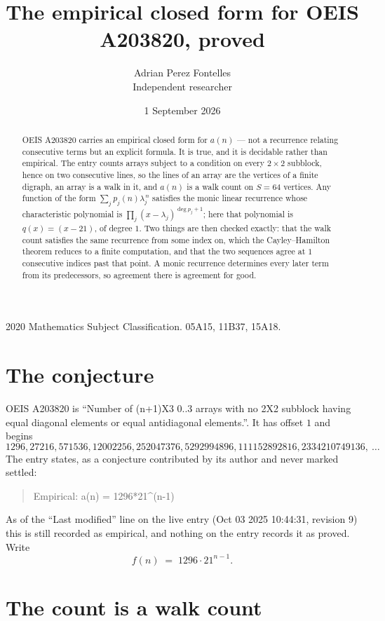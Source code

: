 \documentclass[11pt,a4paper]{article}
\title{The empirical closed form for OEIS A203820, proved}
\author{Adrian Perez Fontelles\\ \small Independent researcher}
\date{1 September 2026}
\theoremstyle{plain}
\theoremstyle{definition}
\begin{document}
\maketitle

\begin{abstract}
OEIS A203820 carries an empirical closed form for $a(n)$ --- not a recurrence relating
consecutive terms but an explicit formula. It is true, and it is decidable rather than
empirical. The entry counts arrays subject to a condition on every $2\times2$ subblock, hence on two consecutive lines, so the lines of an array are the
vertices of a finite digraph, an array is a walk in it, and $a(n)$ is a walk count on
$S=64$ vertices. Any function of the form $\sum_j p_j(n)\lambda_j^{\,n}$ satisfies the
monic linear recurrence whose characteristic polynomial is
$\prod_j(x-\lambda_j)^{\deg p_j+1}$; here that polynomial is $q(x)=(x-21)$, of degree
$1$. Two things are then checked exactly: that the walk count satisfies the same
recurrence from some index on, which the Cayley--Hamilton theorem reduces to a finite
computation, and that the two sequences agree at $1$ consecutive indices past that
point. A monic recurrence determines every later term from its predecessors, so agreement
there is agreement for good.
\end{abstract}

\noindent\small 2020 Mathematics Subject Classification. 05A15, 11B37, 15A18.\normalsize

\section{The conjecture}

OEIS A203820 is ``Number of (n+1)X3 0..3 arrays with no 2X2 subblock having equal diagonal elements or equal antidiagonal elements.''. It has offset $1$ and begins
\[
1296, 27216, 571536, 12002256, 252047376, 5292994896, 111152892816, 2334210749136,\ \dots
\]
The entry states, as a conjecture contributed by its author and never marked settled:
\begin{quote}
Empirical: a(n) = 1296*21\^{}(n-1)
\end{quote}
As of the ``Last modified'' line on the live entry (Oct 03 2025 10:44:31, revision 9) this is still
recorded as empirical, and nothing on the entry records it as proved. Write
\[
f(n)\;=\;1296 \cdot 21^{n - 1}.
\]

\section{The count is a walk count}
\end{document}
